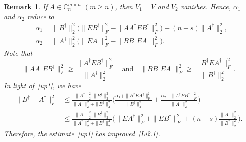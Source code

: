 \documentclass[11pt]{article}
\newtheorem{remark}{Remark}[section]
\begin{document}
\begin{remark}\rm
If $A\in\mathbb{C}^{m\times n}_{n}$ $(m\geq n)$, then $V_{1}=V$ and $V_{2}$ vanishes. Hence, $\alpha_{1}$ and $\alpha_{2}$ reduce to
\begin{align*}
&\alpha_{1}=\|B^{\dagger}\|_{2}^{2}\big(\|EB^{\dagger}\|_{F}^{2}-\|AA^{\dagger}EB^{\dagger}\|_{F}^{2}\big)+(n-s)\|A^{\dagger}\|_{2}^{2},\\
&\alpha_{2}=\|A^{\dagger}\|_{2}^{2}\big(\|EA^{\dagger}\|_{F}^{2}-\|BB^{\dagger}EA^{\dagger}\|_{F}^{2}\big).
\end{align*}
Note that
\begin{displaymath}
\|AA^{\dagger}EB^{\dagger}\|_{F}^{2}\geq\frac{\|A^{\dagger}EB^{\dagger}\|_{F}^{2}}{\|A^{\dagger}\|_{2}^{2}} \quad \text{and} \quad \|BB^{\dagger}EA^{\dagger}\|_{F}^{2}\geq\frac{\|B^{\dagger}EA^{\dagger}\|_{F}^{2}}{\|B^{\dagger}\|_{2}^{2}}.
\end{displaymath}
In light of~\eqref{up1}, we have
\begin{align*}
\|B^{\dagger}-A^{\dagger}\|_{F}^{2}&\leq\frac{\|A^{\dagger}\|_{2}^{2}\|B^{\dagger}\|_{2}^{2}}{\|A^{\dagger}\|_{2}^{2}+\|B^{\dagger}\|_{2}^{2}}\bigg(\frac{\alpha_{1}+\|B^{\dagger}EA^{\dagger}\|_{F}^{2}}{\|B^{\dagger}\|_{2}^{2}}+\frac{\alpha_{2}+\|A^{\dagger}EB^{\dagger}\|_{F}^{2}}{\|A^{\dagger}\|_{2}^{2}}\bigg)\\
&\leq\frac{\|A^{\dagger}\|_{2}^{2}\|B^{\dagger}\|_{2}^{2}}{\|A^{\dagger}\|_{2}^{2}+\|B^{\dagger}\|_{2}^{2}}\bigg(\|EA^{\dagger}\|_{F}^{2}+\|EB^{\dagger}\|_{F}^{2}+(n-s)\frac{\|A^{\dagger}\|_{2}^{2}}{\|B^{\dagger}\|_{2}^{2}}\bigg).
\end{align*}
Therefore, the estimate~\eqref{up1} has improved~\eqref{Li2.1}.
\end{remark}
\end{document}
